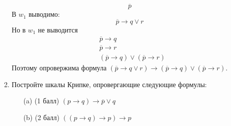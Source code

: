 \begin{enumerate}
\begin{solution}
\begin{equation}
            \overline{p}
        \end{equation}
        В $w_1$ выводимо:
        \begin{equation}
            \overline{p} \rightarrow q \lor r
        \end{equation}
        Но в $w_1$ не выводится
        \begin{align*}
            &\overline{p} \rightarrow q \\
            &\overline{p} \rightarrow r \\
            &(\overline{p} \rightarrow q) \lor (\overline{p} \rightarrow r)
        \end{align*}
        Поэтому опровержима формула $(\overline{p} \rightarrow q \lor r) \rightarrow (\overline{p} \rightarrow q) \lor (\overline{p} \rightarrow r)$.
    \end{solution}
    \item Постройте шкалы Крипке, опровергающие следующие формулы:
    \begin{itemize}
        \item[(a)] (1 балл) $(p \rightarrow q) \rightarrow \overline{p} \lor q$
        \item[(b)] (2 балл) $((p \rightarrow q) \rightarrow p) \rightarrow p$
    \end{itemize}
\end{enumerate}
\clearpage
